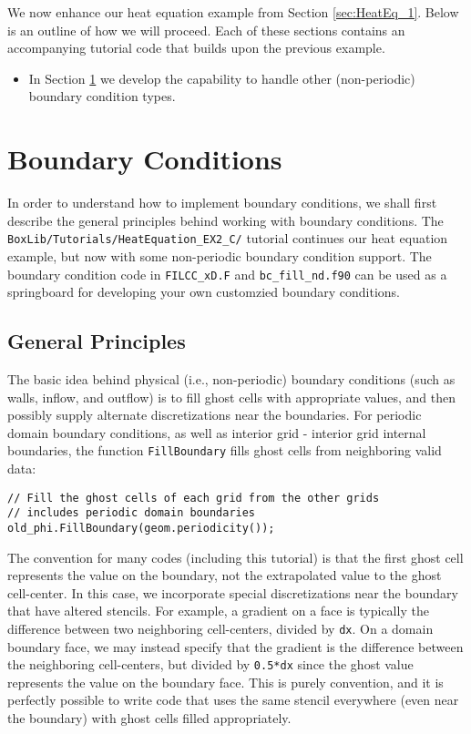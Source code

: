 We now enhance our heat equation example from Section \ref{sec:HeatEq_1}.
Below is an outline of how we will proceed.  Each of these sections contains an 
accompanying tutorial code that builds upon the previous example.
\begin{itemize}

\item In Section \ref{Sec:Boundary Conditions_C} we develop the
  capability to handle other (non-periodic) boundary condition types.

\end{itemize}

\section{Boundary Conditions}\label{Sec:Boundary Conditions_C}
In order to understand how to implement boundary conditions, we shall
first describe the general principles behind working with boundary
conditions.  The {\tt BoxLib/Tutorials/HeatEquation\_EX2\_C/} tutorial
continues our heat equation example, but now with some non-periodic
boundary condition support.  The boundary condition code in 
{\tt FILCC\_xD.F} and {\tt bc\_fill\_nd.f90} can be used as a springboard
for developing your own customzied boundary conditions.

\subsection{General Principles}

The basic idea behind physical (i.e., non-periodic) 
boundary conditions (such as walls, inflow, and outflow)
is to fill ghost cells with appropriate values, and then possibly supply
alternate discretizations near the boundaries.  For periodic domain boundary conditions,
as well as interior grid - interior grid internal boundaries, the function 
{\tt FillBoundary} fills ghost cells from neighboring valid data:
\begin{verbatim}
// Fill the ghost cells of each grid from the other grids
// includes periodic domain boundaries
old_phi.FillBoundary(geom.periodicity());
\end{verbatim}

The convention for many \BoxLib codes (including this tutorial) is that
the first ghost cell represents the value on the boundary, not the extrapolated
value to the ghost cell-center.  In this case, we incorporate special discretizations
near the boundary that have altered stencils.  
For example, a gradient on a face is typically the difference between two neighboring
cell-centers, divided by {\tt dx}.  On a domain boundary face, we may instead specify that
the gradient is the difference between the neighboring cell-centers, but divided
by {\tt 0.5*dx} since the ghost value represents the value on the boundary face.
This is purely convention, and it is perfectly possible to write code that uses 
the same stencil everywhere (even near the boundary) with ghost cells filled appropriately.







